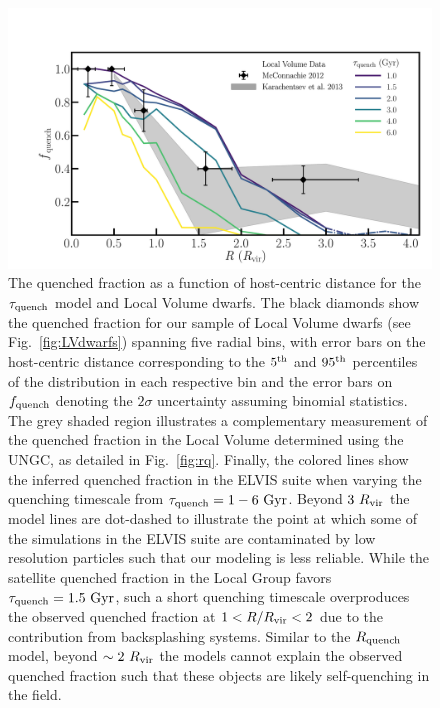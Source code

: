\begin{figure}
 \centering
 \hspace*{-0.1in}
 \includegraphics[width=6in]{fieldquench/fig3.pdf}
 \caption[Radial quenched fraction for Starvation Model]{The quenched fraction as a function of host-centric distance for the
   $\tau_{\rm quench}$ model and Local Volume dwarfs.  The black diamonds show
   the quenched fraction for our sample of Local Volume dwarfs (see
   Fig.~\ref{fig:LVdwarfs}) spanning five radial bins, with error bars on the
   host-centric distance corresponding to the $5^{\rm th}$ and $95^{\rm th}$
   percentiles of the distribution in each respective bin and the error bars on
   $f_{\rm quench}$ denoting the $2\sigma$ uncertainty assuming binomial
   statistics. The grey shaded region illustrates a complementary measurement of
   the quenched fraction in the Local Volume determined using the UNGC, as
   detailed in Fig.~\ref{fig:rq}. Finally, the colored lines show the inferred
   quenched fraction in the ELVIS suite when varying the quenching timescale
   from $\tau_{\rm quench} = 1-6~{\rm Gyr}$.
   Beyond $3~R_{\rm{vir}}$ the model lines are dot-dashed to illustrate the
   point at which some of the simulations in the ELVIS suite are
   contaminated by low resolution particles such that our modeling is
   less reliable. 
   While the satellite quenched fraction in the Local Group favors
   $\tau_{\rm quench}=1.5~{\rm Gyr}$, such a short quenching timescale
   overproduces the observed quenched fraction at $1 < R/R_{\rm{vir}} <
   2$ due to the contribution from backsplashing systems.
   Similar to the $R_{\rm quench}$ model, beyond $\sim2~R_{\rm{vir}}$ the
   models cannot explain the observed quenched fraction such that
   these objects are likely self-quenching in the field.}
 \label{fig:tq}
\end{figure}


